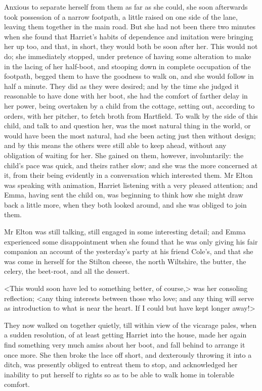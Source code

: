 Anxious to separate herself from them as far as she could, she soon afterwards took possession of a narrow footpath, a little raised on one side of the lane, leaving them together in the main road. But she had not been there two minutes when she found that Harriet's habits of dependence and imitation were bringing her up too, and that, in short, they would both be soon after her. This would not do; she immediately stopped, under pretence of having some alteration to make in the lacing of her half-boot, and stooping down in complete occupation of the footpath, begged them to have the goodness to walk on, and she would follow in half a minute. They did as they were desired; and by the time she judged it reasonable to have done with her boot, she had the comfort of farther delay in her power, being overtaken by a child from the cottage, setting out, according to orders, with her pitcher, to fetch broth from Hartfield. To walk by the side of this child, and talk to and question her, was the most natural thing in the world, or would have been the most natural, had she been acting just then without design; and by this means the others were still able to keep ahead, without any obligation of waiting for her. She gained on them, however, involuntarily: the child's pace was quick, and theirs rather slow; and she was the more concerned at it, from their being evidently in a conversation which interested them. Mr Elton was speaking with animation, Harriet listening with a very pleased attention; and Emma, having sent the child on, was beginning to think how she might draw back a little more, when they both looked around, and she was obliged to join them.

Mr Elton was still talking, still engaged in some interesting detail; and Emma experienced some disappointment when she found that he was only giving his fair companion an account of the yesterday's party at his friend Cole's, and that she was come in herself for the Stilton cheese, the north Wiltshire, the butter, the celery, the beet-root, and all the dessert.

<This would soon have led to something better, of course,> was her consoling reflection; <any thing interests between those who love; and any thing will serve as introduction to what is near the heart. If I could but have kept longer away!>

They now walked on together quietly, till within view of the vicarage pales, when a sudden resolution, of at least getting Harriet into the house, made her again find something very much amiss about her boot, and fall behind to arrange it once more. She then broke the lace off short, and dexterously throwing it into a ditch, was presently obliged to entreat them to stop, and acknowledged her inability to put herself to rights so as to be able to walk home in tolerable comfort.

